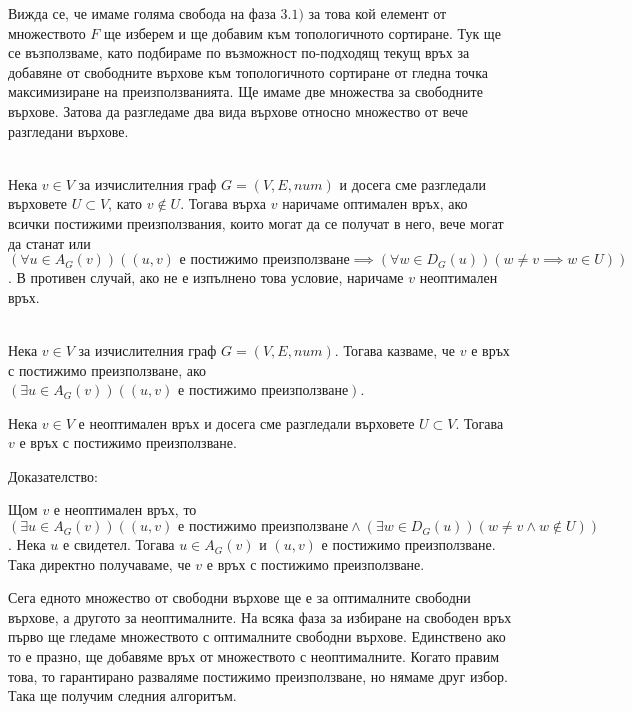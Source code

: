 \documentclass[12pt,twoside,a4paper]{article}
\begin{document}
	Вижда се, че имаме голяма свобода на фаза $3.1)$ за това кой елемент от множеството $F$ ще изберем и ще добавим към топологичното сортиране. Тук ще се възползваме, като подбираме по възможност по-подходящ текущ връх за добавяне от свободните върхове към топологичното сортиране от гледна точка максимизиране на преизползванията. Ще имаме две множества за свободните върхове. Затова да разгледаме два вида върхове относно множество от вече разгледани върхове.
	
	\begin{definition}\label{def:types-free-v}~\\
		\indent Нека $v \in V$ за изчислителния граф $G=(V,E,num)$ и досега сме разгледали върховете $U \subset V$, като $v \notin U$. Тогава върха $v$ наричаме оптимален връх, ако всички постижими преизползвания, които могат да се получат в него, вече могат да станат или $(\forall u \in A_G(v))((u,v)\text{ е постижимо преизползване} \implies (\forall w \in D_G(u))(w \neq v \implies w \in U))$. В противен случай, ако не е изпълнено това условие, наричаме $v$ неоптимален връх.
	\end{definition}
	
	\begin{definition}~\\
		\indent Нека $v \in V$ за изчислителния граф $G=(V,E,num)$. Тогава казваме, че $v$ е връх с постижимо преизползване, ако $(\exists u \in A_G(v))((u,v)\text{ е постижимо преизползване})$.
	\end{definition}
	
	\begin{statement}\label{stmnt:nonopt-vertex} Нека $v \in V$ е неоптимален връх и досега сме разгледали върховете $U \subset V$. Тогава $v$ е връх с постижимо преизползване.
		
		\noindent Доказателство:
		
		Щом $v$ е неоптимален връх, то $(\exists u \in A_G(v))((u,v)\text{ е постижимо преизползване} \land (\exists w \in D_G(u))(w \neq v \land w \notin U))$. Нека $u$ е свидетел. Тогава $u \in A_G(v)$ и $(u,v)$ е постижимо преизползване. Така директно получаваме, че $v$ е връх с постижимо преизползване.
	\end{statement}
	
	Сега едното множество от свободни върхове ще е за оптималните свободни върхове, а другото за неоптималните. На всяка фаза за избиране на свободен връх първо ще гледаме множеството с оптималните свободни върхове. Единствено ако то е празно, ще добавяме връх от множеството с неоптималните. Когато правим това, то гарантирано разваляме постижимо преизползване, но нямаме друг избор. Така ще получим следния алгоритъм.
	
\end{document}
